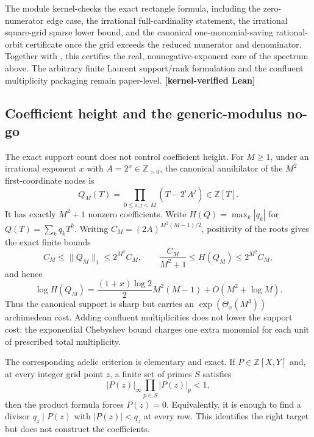 \documentclass[11pt,oneside]{article}
\theoremstyle{definition}
\theoremstyle{remark}
\newcommand{\Z}{\mathbb Z}
\newcommand{\lean}[1]{\texttt{\detokenize{#1}}}
\newcommand{\statuslean}{\textcolor{leanblue}{\textbf{[kernel-verified Lean]}}}
\begin{document}
The module \lean{RationalOrbitGrid} kernel-checks the exact rectangle formula, including the
zero-numerator edge case, the irrational full-cardinality statement, the irrational square-grid
sparse lower bound, and the canonical one-monomial-saving rational-orbit certificate once the grid exceeds
the reduced numerator and denominator.  Together with \lean{SparsePowerCurve}, this certifies
the real, nonnegative-exponent core of the spectrum above.  The arbitrary finite Laurent
support/rank formulation and the confluent multiplicity packaging remain paper-level.
\statuslean

\subsection{Coefficient height and the generic-modulus no-go}
\label{fc:sparse-height-no-go}

The exact support count does not control coefficient height.  For $M\ge1$, under an irrational
exponent $x$ with $A=2^x\in\Z_{>0}$, the canonical annihilator of the $M^2$
first-coordinate nodes is
\[
 Q_M(T)=\prod_{0\le i,j<M}(T-2^iA^j)\in\Z[T].
\]
It has exactly $M^2+1$ nonzero coefficients.  Write
$H(Q)=\max_k|q_k|$ for $Q(T)=\sum_kq_kT^k$.  Writing
$C_M=(2A)^{M^2(M-1)/2}$, positivity of the roots gives the exact finite bounds
\begin{equation}
 C_M\le\lVert Q_M\rVert_1\le2^{M^2}C_M,
 \qquad
 \frac{C_M}{M^2+1}\le H(Q_M)\le2^{M^2}C_M,
 \label{fc:eq-canonical-height}
\end{equation}
and hence
\[
 \log H(Q_M)=\frac{(1+x)\log2}{2}M^2(M-1)+O(M^2+\log M).
\]
Thus the canonical support is sharp but carries an $\exp(\Theta_x(M^3))$ archimedean cost.
Adding confluent multiplicities does not lower the support cost: the exponential Chebyshev
bound charges one extra monomial for each unit of prescribed total multiplicity.

The corresponding adelic criterion is elementary and exact.  If $P\in\Z[X,Y]$ and, at every
integer grid point $z$, a finite set of primes $S$ satisfies
\[
 |P(z)|_\infty\prod_{p\in S}|P(z)|_p<1,
\]
then the product formula forces $P(z)=0$.  Equivalently, it is enough to find a divisor
$q_z\mid P(z)$ with $|P(z)|<q_z$ at every row.  This identifies the right target but does not
construct the coefficients.
\end{document}
